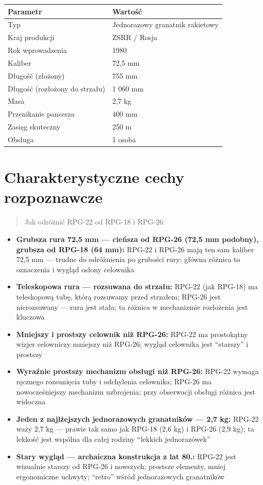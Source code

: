 \documentclass[12pt,openany,oneside]{book}
\providecommand{\tightlist}{%
  \setlength{\itemsep}{0pt}\setlength{\parskip}{0pt}}
\begin{document}
\begin{longtable}[]{@{}ll@{}}
\toprule\noalign{}
Parametr & Wartość \\
\midrule\noalign{}
\endhead
\bottomrule\noalign{}
\endlastfoot
Typ & Jednorazowy granatnik rakietowy \\
Kraj produkcji & ZSRR / Rosja \\
Rok wprowadzenia & 1980 \\
Kaliber & 72,5 mm \\
Długość (złożony) & 755 mm \\
Długość (rozłożony do strzału) & 1 060 mm \\
Masa & 2,7 kg \\
Przenikanie pancerza & 400 mm \\
Zasięg skuteczny & 250 m \\
Obsługa & 1 osoba \\
\end{longtable}

\section{Charakterystyczne cechy
rozpoznawcze}\label{charakterystyczne-cechy-rozpoznawcze-70}

\begin{quote}
Jak odróżnić RPG-22 od RPG-18 i RPG-26:
\end{quote}

\begin{itemize}
\tightlist
\item
  \textbf{Grubsza rura 72,5 mm --- cieńsza od RPG-26 (72,5 mm podobny),
  grubsza od RPG-18 (64 mm):} RPG-22 i RPG-26 mają ten sam kaliber 72,5
  mm --- trudne do odróżnienia po grubości rury; główna różnica to
  oznaczenia i wygląd osłony celownika
\item
  \textbf{Teleskopowa rura --- rozsuwana do strzału:} RPG-22 (jak
  RPG-18) ma teleskopową tubę, którą rozsuwamy przed strzałem; RPG-26
  jest nierozsuwany --- rura jest stała; ta różnica w mechanizmie
  rozłożenia jest kluczowa
\item
  \textbf{Mniejszy i prostszy celownik niż RPG-26:} RPG-22 ma
  prosto­kątny wizjer celowniczy mniejszy niż RPG-26; wygląd celownika
  jest ``starszy'' i prostszy
\item
  \textbf{Wyraźnie prostszy mechanizm obsługi niż RPG-26:} RPG-22 wymaga
  ręcznego rozsunięcia tuby i odchylenia celownika; RPG-26 ma
  nowocześniejszy mechanizm uzbrojenia; przy obserwacji obsługi różnica
  jest widoczna
\item
  \textbf{Jeden z najlżejszych jednorazowych granatników --- 2,7 kg:}
  RPG-22 waży 2,7 kg --- prawie tak samo jak RPG-18 (2,6 kg) i RPG-26
  (2,9 kg); ta lekkość jest wspólna dla całej rodziny ``lekkich
  jednorazówek''
\item
  \textbf{Stary wygląd --- archaiczna konstrukcja z lat 80.:} RPG-22
  jest wizualnie starszy od RPG-26 i nowszych; prostsze elementy, mniej
  ergonomiczne uchwyty; ``retro'' wśród jednorazowych granatników
\end{itemize}
\end{document}
